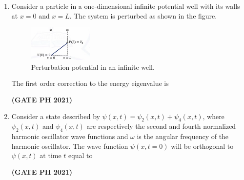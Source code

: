 \documentclass[14pt, a4paper]{extarticle}
\begin{document}
\begin{enumerate}[label=\textbf{Q.\arabic*}]
\begin{enumerate}[label=\textbf{Q.\arabic*}]
\item Consider a particle in a one-dimensional infinite potential well with its walls at $x=0$ and $x=L$. The system is perturbed as shown in the figure.
\begin{figure}[H]
\centering
\includegraphics[width=0.3\textwidth]{figs/q44fig21.png}
\caption{Perturbation potential in an infinite well.}
\label{fig:q34ph}
\end{figure}
The first order correction to the energy eigenvalue is
\begin{enumerate}
\end{enumerate}
\hfill \textbf{(GATE PH 2021)}

\item Consider a state described by $\psi(x,t) = \psi_2(x,t) + \psi_4(x,t)$, where $\psi_2(x,t)$ and $\psi_4(x,t)$ are respectively the second and fourth normalized harmonic oscillator wave functions and $\omega$ is the angular frequency of the harmonic oscillator. The wave function $\psi(x,t=0)$ will be orthogonal to $\psi(x,t)$ at time $t$ equal to
\begin{enumerate}
\end{enumerate}
\hfill \textbf{(GATE PH 2021)}


\end{enumerate}
\end{enumerate}
\end{document}
